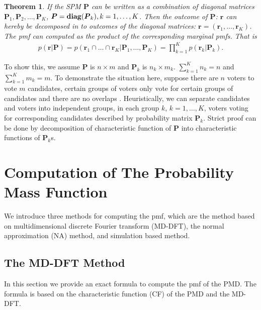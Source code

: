 \documentclass[12pt]{article}
\newcommand{\diag}{\textrm{diag}}
\newtheorem{thm}{Theorem}
\begin{document}
\begin{thm}
If the SPM $\boldsymbol{P}$ can be written as a combination of diagonal matrices $\boldsymbol{P}_1, \boldsymbol{P}_2, \dots, \boldsymbol{P}_{K}$, $\boldsymbol{P} = \textbf{\diag}(\boldsymbol{P}_{k}), k=1,\dots,K$. Then the outcome of $\boldsymbol{P}$: $\boldsymbol{r}$ can hereby be decomposed in to  outcomes of the diagonal matrices: $\boldsymbol{r} = (\boldsymbol{r}_{1},\dots,\boldsymbol{r}_{K})$. The pmf can computed as the product of the corresponding marginal pmfs. That is
\begin{align*}
p(\boldsymbol{r}|\boldsymbol{P})= p(\boldsymbol{r}_{1} \cap \dots \cap \boldsymbol{r}_{K}|\boldsymbol{P}_1,\dots,\boldsymbol{P}_{K} )= \prod_{k=1}^K p(\boldsymbol{r}_{k}|\boldsymbol{P}_{k}).
\end{align*}
\end{thm}
To show this, we assume $\boldsymbol{P}$ is $n \times m$ and $\boldsymbol{P}_{k}$ is $n_k \times m_k$. $\sum_{k=1}^K n_k = n$ and $\sum_{k=1}^K m_k = m$. To demonstrate the situation here, suppose there are $n$ voters to vote $m$ candidates, certain groups of voters only vote for certain groups of candidates and there are no overlaps . Heuristically, we can separate candidates and voters into independent groups, in each group $k$, $k = 1,\dots,K$, voters voting for corresponding candidates 
described by probability matrix $\boldsymbol{P}_k$. Strict proof can be done by decomposition of characteristic function of $\boldsymbol{P}$ into characteristic functions of $\boldsymbol{P}_{k}$s.



\section{Computation of The Probability Mass Function}\label{sec:CA.driving.study}
We introduce three methods for computing the pmf, which are the method based on multidimensional discrete Fourier transform (MD-DFT), the normal approximation (NA) method, and simulation based method.

\subsection{The MD-DFT Method}
In this section we provide an exact formula to compute the pmf of the PMD. The formula is based on the characteristic function (CF) of the PMD and the MD-DFT.
\end{document}
